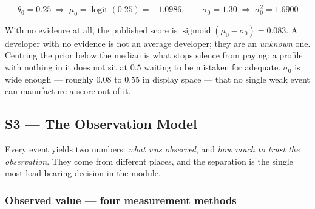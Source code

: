\documentclass[11pt,a4paper]{article}
\DeclareMathOperator{\logit}{logit}
\DeclareMathOperator{\sig}{sigmoid}
\begin{document}
\[
\theta_0 = 0.25 \;\Rightarrow\; \mu_0 = \logit(0.25) = -1.0986,
\qquad
\sigma_0 = 1.30 \;\Rightarrow\; \sigma_0^2 = 1.6900
\]

With no evidence at all, the published score is $\sig(\mu_0 - \sigma_0) =
0.083$. A developer with no evidence is not an average developer; they are
an \emph{unknown} one. Centring the prior below the median is what stops
silence from paying: a profile with nothing in it does not sit at $0.5$
waiting to be mistaken for adequate. $\sigma_0$ is wide enough --- roughly
$0.08$ to $0.55$ in display space --- that no single weak event can
manufacture a score out of it.

\subsection{S3 --- The Observation Model}
\label{sec:s3}

Every event yields two numbers: \emph{what was observed}, and \emph{how much
to trust the observation}. They come from different places, and the
separation is the single most load-bearing decision in the module.

\subsubsection*{Observed value --- four measurement methods}
\end{document}
